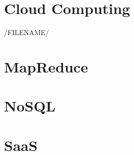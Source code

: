 \part{Cloud Computing}


/FILENAME/

%

%





\part{MapReduce}



\part{NoSQL}



\part{SaaS}
\label{sec:icloud-saas}



%
%

